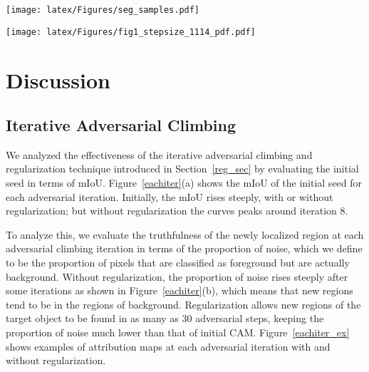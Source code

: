 \documentclass[final]{cvpr}
\begin{document}
\begin{figure*}[t]
\centering
\texttt{[image: latex/Figures/seg\_samples.pdf]}
\vspace{-.7em}
\caption{\label{segsample} Examples of predicted semantic masks for PASCAL VOC \textit{val} images in weakly and semi-supervised manner.}
\vspace{-1em}
\end{figure*}
 \begin{figure*}[t]
\centering
\texttt{[image: latex/Figures/fig1\_stepsize\_1114\_pdf.pdf]}
\vspace{-.7em}
\caption{\label{eachiter} 
Effect of adversarial climbing and regularization on (a) the seed quality and (b) the proportion of noise. (c) Effect of the regularization coefficient . (d) Effect of the masking threshold . (d) Effect of the step size .}
\vspace{-1em}
\end{figure*}
 
\section{Discussion}



\subsection{Iterative Adversarial Climbing}\label{iterative}
We analyzed the effectiveness of the iterative adversarial climbing and regularization technique introduced in Section~\ref{reg_sec} by evaluating the initial seed in terms of mIoU. Figure~\ref{eachiter}(a) shows the mIoU of the initial seed for each adversarial iteration. Initially, the mIoU rises steeply, with or without regularization; but without regularization the curves peaks around iteration 8.

To analyze this, we evaluate the truthfulness of the newly localized region at each adversarial climbing iteration in terms of the proportion of noise, which we define to be the proportion of pixels that are classified as foreground but are actually background. Without regularization, the proportion of noise rises steeply after some iterations as shown in Figure~\ref{eachiter}(b), which means that new regions tend to be in the regions of background.
Regularization allows new regions of the target object to be found in as many as 30 adversarial steps, keeping the proportion of noise much lower than that of initial CAM.
Figure~\ref{eachiter_ex} shows examples of attribution maps at each adversarial iteration with and without regularization.
\end{document}
